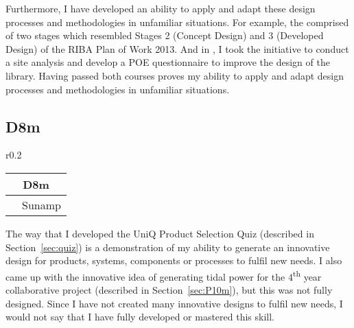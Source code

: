Furthermore, I have developed an ability to apply and adapt these design processes and methodologies in unfamiliar situations.
For example, the \PRJTitle \space comprised of two stages which resembled Stages 2 (Concept Design) and 3 (Developed Design) of the RIBA Plan of Work 2013.
And in \CASTitle, I took the initiative to conduct a site analysis and develop a POE questionnaire to improve the design of the library.
Having passed both courses proves my ability to apply and adapt design processes and methodologies in unfamiliar situations.








\subsection*{D8m}

\begin{wraptable}{r}{0.2\textwidth}
	\begin{tabular}{|ll|}
		\hline
		\multicolumn{2}{|c|}{\cellcolor[HTML]{F8A102}\textbf{D8m} \nomaster} \\ \hline
		\PRJ & Sunamp \\ \hline
	\end{tabular}
\end{wraptable}

The way that I developed the UniQ Product Selection Quiz (described in Section~\ref{sec:quiz}) is a demonstration of my ability to generate an innovative design for products, systems, components or processes to fulfil new needs.
I also came up with the innovative idea of generating tidal power for the 4\textsuperscript{th} year collaborative project (described in Section~\ref{sec:P10m}), but this was not fully designed.
Since I have not created many innovative designs to fulfil new needs, I would not say that I have fully developed or mastered this skill.


